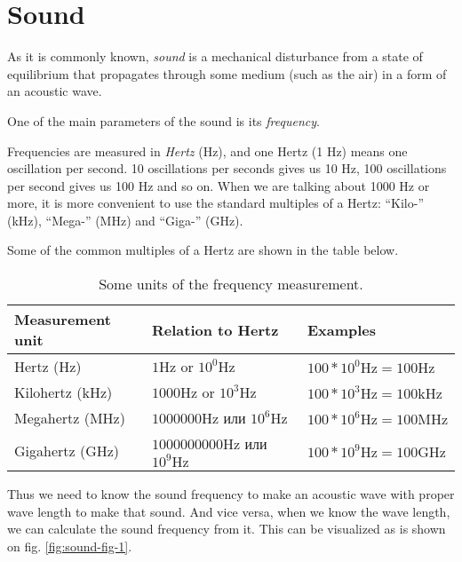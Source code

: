 \documentclass[../sparc.tex]{subfiles}
\begin{document}
\section{Sound}

As it is commonly known, \emph{sound} is a mechanical disturbance from a state
of equilibrium that propagates through some medium (such as the air) in a form
of an acoustic wave. \cite{britannica:sound}

One of the main parameters of the sound is its \emph{frequency}.

Frequencies are measured in \emph{Hertz} (\gls{Hz}), and one Hertz (1 Hz) means
one oscillation per second.  10 oscillations per seconds gives us 10 Hz, 100
oscillations per second gives us 100 Hz and so on.  When we are talking about
1000 Hz or more, it is more convenient to use the standard multiples of a Hertz:
``Kilo-'' (\gls{kHz}), ``Mega-'' (\gls{MHz}) and ``Giga-'' (\gls{GHz}).

Some of the common multiples of a Hertz are shown in the table below.

\begin{table}[h]
  \centering
  \begin{tabular}{p{3cm}|p{4cm}|p{3.5cm}}
    Measurement unit & Relation to Hertz & Examples \\
    \hline \hline
    Hertz (Hz)
    & $ 1 \mbox{Hz} $ or $ 10^0 \mbox{Hz} $
    & $ 100 * 10^0 \mbox{Hz} = 100 \mbox{Hz} $ \\
    \hline
    Kilohertz (kHz)
    & $ 1000 \mbox{Hz} $ or $ 10^3 \mbox{Hz} $
    & $ 100 * 10^3 \mbox{Hz} = 100 \mbox{kHz} $ \\
    \hline
    Megahertz (MHz)
    & $ 1000000 \mbox{Hz} $ или $ 10^6 \mbox{Hz} $
    & $ 100 * 10^6 \mbox{Hz} = 100 \mbox{MHz} $ \\
    \hline
    Gigahertz (GHz)
    & $ 1000000000 \mbox{Hz} $ или $ 10^9 \mbox{Hz} $
    & $ 100 * 10^9 \mbox{Hz} = 100 \mbox{GHz} $ \\
  \end{tabular}
  \caption{Some units of the frequency measurement.}
  \label{table:sound-hertz-scale}
\end{table}

Thus we need to know the sound frequency to make an acoustic wave with proper
wave length to make that sound.  And vice versa, when we know the wave length,
we can calculate the sound frequency from it.  This can be visualized as is
shown on fig. \ref{fig:sound-fig-1}.
\end{document}
